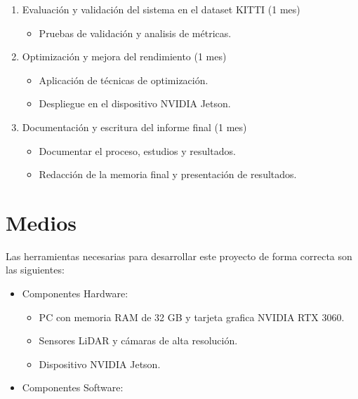 \begin{enumerate}
\item Evaluación y validación del sistema en el dataset KITTI (1 mes)
	\begin{itemize}
		\item Pruebas de validación y analisis de métricas.
	\end{itemize}

\item Optimización y mejora del rendimiento (1 mes)
	\begin{itemize}
		\item Aplicación de técnicas de optimización.
		\item Despliegue en el dispositivo NVIDIA Jetson.
	\end{itemize}

\item Documentación y escritura del informe final (1 mes)
	\begin{itemize}
		\item Documentar el proceso, estudios y resultados.
		\item Redacción de la memoria final y presentación de resultados.
	\end{itemize}

\end{enumerate}


\section{Medios}
\label{sec:medios}

Las herramientas necesarias para desarrollar este proyecto de forma correcta
son las siguientes:
\begin{itemize}

\item Componentes Hardware:
	\begin{itemize}
	\item PC con memoria RAM de 32 GB y tarjeta grafica NVIDIA RTX 3060.
	\item Sensores LiDAR y cámaras de alta resolución.
	\item Dispositivo NVIDIA Jetson.
	\end{itemize}

\item Componentes Software:

\end{itemize}


